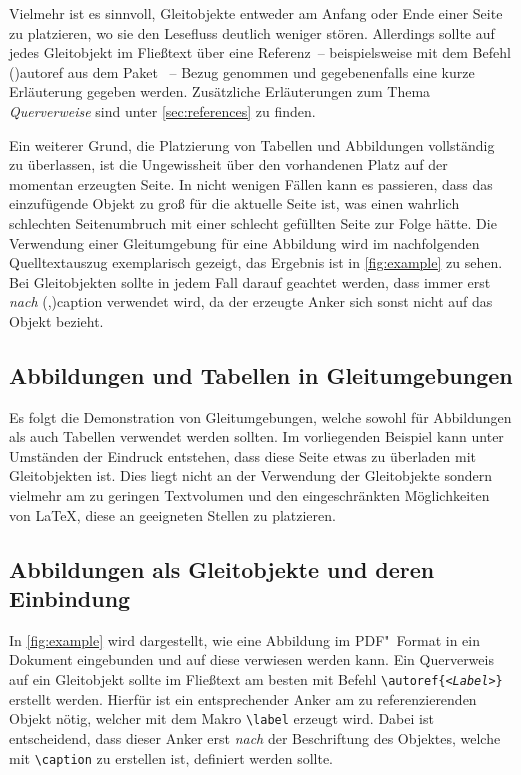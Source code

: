 \documentclass[%
  english,ngerman,%
  cdgeometry=no,DIV=12,%
  cd=false,cdfont=false,cdtitle=true,%
  headings=normal,%
  automark,%
  listof=toc,%
]{tudscrartcl}
\begin{document}
Vielmehr ist es sinnvoll, Gleitobjekte entweder am Anfang oder Ende einer Seite 
zu platzieren, wo sie den Lesefluss deutlich weniger stören. Allerdings sollte 
auf jedes Gleitobjekt im Fließtext über eine Referenz~-- beispielsweise mit dem 
Befehl \Macro(){autoref} aus dem Paket ~-- 
Bezug genommen und gegebenenfalls eine kurze Erläuterung gegeben werden. 
Zusätzliche Erläuterungen zum Thema \emph{Querverweise} sind unter 
\autoref{sec:references} zu finden.

Ein weiterer Grund,  die Platzierung von Tabellen und 
Abbildungen vollständig zu überlassen, ist die Ungewissheit über den 
vorhandenen Platz auf der momentan erzeugten Seite. In nicht wenigen Fällen 
kann es passieren, dass das einzufügende Objekt zu groß für die aktuelle Seite 
ist, was einen wahrlich schlechten Seitenumbruch mit einer schlecht gefüllten 
Seite zur Folge hätte. Die Verwendung einer Gleitumgebung für eine Abbildung 
wird im nachfolgenden Quelltextauszug exemplarisch gezeigt, das Ergebnis ist in 
\autoref{fig:example} zu sehen. Bei Gleitobjekten sollte in jedem Fall darauf 
geachtet werden, dass  immer erst \emph{nach} 
\Macro(,){caption} verwendet wird, da 
der erzeugte Anker sich sonst nicht auf das Objekt bezieht.
%
\begin{Trunk+}
\section{Abbildungen und Tabellen in Gleitumgebungen}

Es folgt die Demonstration von Gleitumgebungen, welche sowohl für 
Abbildungen als auch Tabellen verwendet werden sollten. Im vorliegenden 
Beispiel kann unter Umständen der Eindruck entstehen, dass diese Seite 
etwas zu überladen mit Gleitobjekten ist. Dies liegt nicht an der 
Verwendung der Gleitobjekte sondern vielmehr am zu geringen Textvolumen 
und den eingeschränkten Möglichkeiten von \LaTeX{}, diese an geeigneten 
Stellen zu platzieren. 



\subsection{Abbildungen als Gleitobjekte und deren Einbindung}

In \autoref{fig:example} wird dargestellt, wie eine Abbildung im 
PDF"~Format in ein Dokument eingebunden und auf diese verwiesen werden 
kann. Ein Querverweis auf ein Gleitobjekt sollte im Fließtext am besten 
mit Befehl \texttt{\textbackslash autoref\{\emph{<Label>}\}} erstellt 
werden. Hierfür ist ein entsprechender Anker am zu referenzierenden 
Objekt nötig, welcher mit dem Makro \texttt{\textbackslash label} erzeugt 
wird. Dabei ist entscheidend, dass dieser Anker erst \emph{nach} der 
Beschriftung des Objektes, welche mit \texttt{\textbackslash caption} zu 
erstellen ist, definiert werden sollte.

\end{Trunk+}
\end{document}
